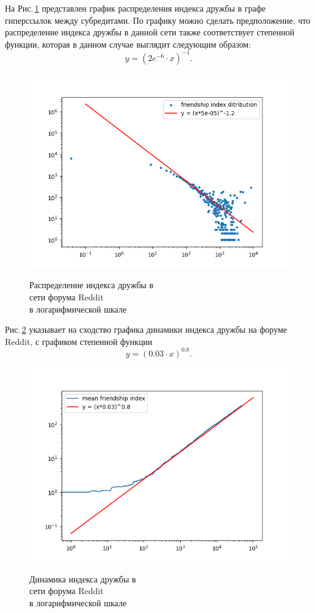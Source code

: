 \documentclass[bachelor, och, diploma]{SCWorks}
\begin{document}
На Рис.\,\ref{fig:reds} представлен график распределения индекса дружбы в графе гиперссылок между субредитами. По графику можно сделать предположение, что распределение индекса дружбы в данной сети также соответствует степенной функции, которая в данном случае выглядит следующим образом:
\[
y = (2e^{-6} \cdot x)^{-1}.
\]
\begin{figure}[!ht]
\centering
\includegraphics[scale=0.7]{diploma_results/static_real_log/soc-redditHyperlinks-body.png}\\
\caption{Распределение индекса дружбы  в\\ сети форума Reddit\\ в логарифмической шкале}\label{fig:reds}
\end{figure}

Рис.\,\ref{fig:redd} указывает на сходство графика динамики индекса дружбы на форуме Reddit, с графиком степенной функции 
\[
y = (0.03 \cdot x)^{0.8}.
\]
\begin{figure}[!ht]
\centering
\includegraphics[scale=0.7]{diploma_results/dynamic_real_log/soc-redditHyperlinks-body_mean.png}\\
\caption{Динамика индекса дружбы  в\\ сети форума Reddit\\ в логарифмической шкале}\label{fig:redd}
\end{figure}
\end{document}
